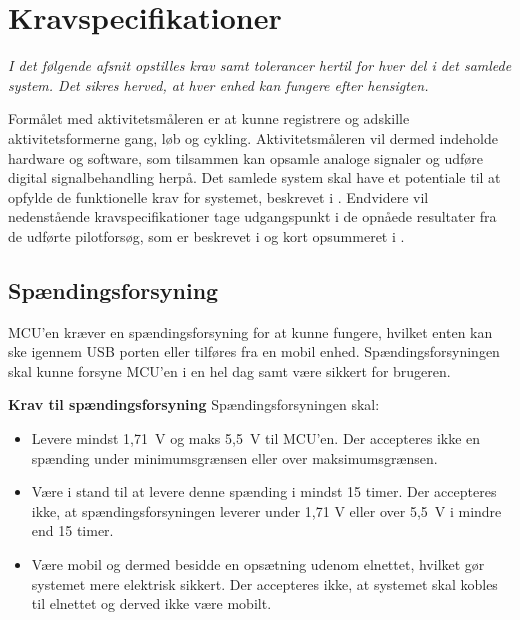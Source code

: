 \section{Kravspecifikationer}
\textit{I det følgende afsnit opstilles krav samt tolerancer hertil for hver del i det samlede system. Det sikres herved, at hver enhed kan fungere efter hensigten.}

Formålet med aktivitetsmåleren er at kunne registrere og adskille aktivitetsformerne gang, løb og cykling. Aktivitetsmåleren vil dermed indeholde hardware og software, som tilsammen kan opsamle analoge signaler og udføre digital signalbehandling herpå. Det samlede system skal have et potentiale til at opfylde de funktionelle krav for systemet, beskrevet i . Endvidere vil nedenstående kravspecifikationer tage udgangspunkt i de opnåede resultater fra de udførte pilotforsøg, som er beskrevet i  og kort opsummeret i .
%

\subsection{Spændingsforsyning} \label{krav_spaendingsf}
MCU'en kræver en spændingsforsyning for at kunne fungere, hvilket enten kan ske igennem USB porten eller tilføres fra en mobil enhed. Spændingsforsyningen skal kunne forsyne MCU'en i en hel dag samt være sikkert for brugeren. %

\textbf{Krav til spændingsforsyning} \newline 
Spændingsforsyningen skal:
\begin{itemize}
	\item Levere mindst 1,71~V og maks 5,5~V til MCU'en. Der accepteres ikke en spænding under minimumsgrænsen eller over maksimumsgrænsen. %
	\item Være i stand til at levere denne spænding i mindst 15 timer. Der accepteres ikke, at spændingsforsyningen leverer under 1,71 V eller over 5,5~V i mindre end 15 timer.
	\item Være mobil og dermed besidde en opsætning udenom elnettet, hvilket gør systemet mere elektrisk sikkert. Der accepteres ikke, at systemet skal kobles til elnettet og derved ikke være mobilt.
\end{itemize}

